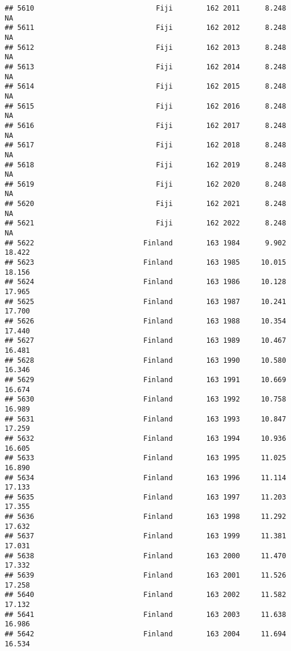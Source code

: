 \documentclass[
]{article}
\begin{document}
\begin{verbatim}
## 5610                             Fiji        162 2011      8.248         NA
## 5611                             Fiji        162 2012      8.248         NA
## 5612                             Fiji        162 2013      8.248         NA
## 5613                             Fiji        162 2014      8.248         NA
## 5614                             Fiji        162 2015      8.248         NA
## 5615                             Fiji        162 2016      8.248         NA
## 5616                             Fiji        162 2017      8.248         NA
## 5617                             Fiji        162 2018      8.248         NA
## 5618                             Fiji        162 2019      8.248         NA
## 5619                             Fiji        162 2020      8.248         NA
## 5620                             Fiji        162 2021      8.248         NA
## 5621                             Fiji        162 2022      8.248         NA
## 5622                          Finland        163 1984      9.902     18.422
## 5623                          Finland        163 1985     10.015     18.156
## 5624                          Finland        163 1986     10.128     17.965
## 5625                          Finland        163 1987     10.241     17.700
## 5626                          Finland        163 1988     10.354     17.440
## 5627                          Finland        163 1989     10.467     16.481
## 5628                          Finland        163 1990     10.580     16.346
## 5629                          Finland        163 1991     10.669     16.674
## 5630                          Finland        163 1992     10.758     16.989
## 5631                          Finland        163 1993     10.847     17.259
## 5632                          Finland        163 1994     10.936     16.605
## 5633                          Finland        163 1995     11.025     16.890
## 5634                          Finland        163 1996     11.114     17.133
## 5635                          Finland        163 1997     11.203     17.355
## 5636                          Finland        163 1998     11.292     17.632
## 5637                          Finland        163 1999     11.381     17.031
## 5638                          Finland        163 2000     11.470     17.332
## 5639                          Finland        163 2001     11.526     17.258
## 5640                          Finland        163 2002     11.582     17.132
## 5641                          Finland        163 2003     11.638     16.986
## 5642                          Finland        163 2004     11.694     16.534

\end{verbatim}
\end{document}
